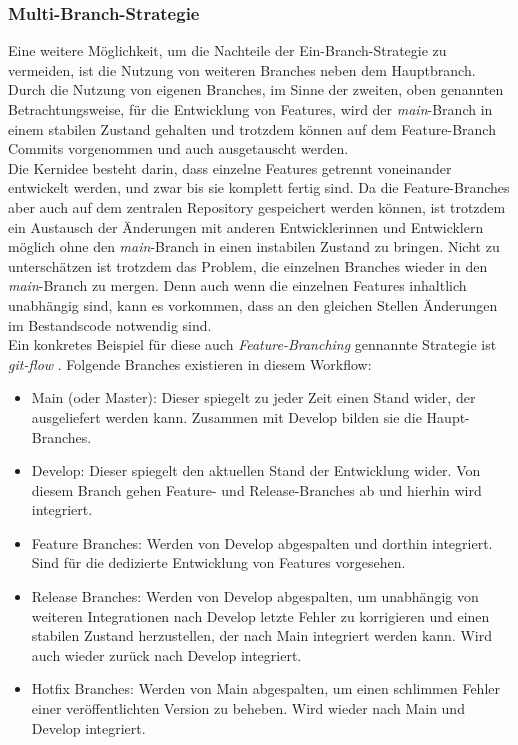 \subsubsection{Multi-Branch-Strategie}
\label{sec:implementierung:workflows:feature}

Eine weitere Möglichkeit, um die Nachteile der Ein-Branch-Strategie zu vermeiden, ist die Nutzung von weiteren Branches neben dem Hauptbranch. 
Durch die Nutzung von eigenen Branches, im Sinne der zweiten, oben genannten Betrachtungsweise, für die Entwicklung von Features, wird der \emph{main}-Branch in einem stabilen Zustand gehalten und trotzdem können auf dem Feature-Branch Commits vorgenommen und auch ausgetauscht werden. 
\\
Die Kernidee besteht darin, dass einzelne Features getrennt voneinander entwickelt werden, und zwar bis sie komplett fertig sind. Da die Feature-Branches aber auch auf dem zentralen Repository gespeichert werden können, ist trotzdem ein Austausch der Änderungen mit anderen Entwicklerinnen und Entwicklern möglich ohne den \emph{main}-Branch in einen instabilen Zustand zu bringen.
Nicht zu unterschätzen ist trotzdem das Problem, die einzelnen Branches wieder in den \emph{main}-Branch zu mergen. Denn auch wenn die einzelnen Features inhaltlich unabhängig sind, kann es vorkommen, dass an den gleichen Stellen Änderungen im Bestandscode notwendig sind.
\\
Ein konkretes Beispiel für diese auch \emph{Feature-Branching} gennannte Strategie ist \emph{git-flow} \cite{Driessen:2010:A-successful:47}. Folgende Branches existieren in diesem Workflow:
\begin{itemize}
\item
Main (oder Master): Dieser spiegelt zu jeder Zeit einen Stand wider, der ausgeliefert werden kann. Zusammen mit Develop bilden sie die Haupt-Branches.
\item
Develop: Dieser spiegelt den aktuellen Stand der Entwicklung wider. Von diesem Branch gehen Feature- und Release-Branches ab und hierhin wird integriert.
\item
Feature Branches: Werden von Develop abgespalten und dorthin integriert. Sind für die dedizierte Entwicklung von Features vorgesehen.
\item
Release Branches: Werden von Develop abgespalten, um unabhängig von weiteren Integrationen nach Develop letzte Fehler zu korrigieren und einen stabilen Zustand herzustellen, der nach Main integriert werden kann. Wird auch wieder zurück nach Develop integriert.
\item
Hotfix Branches: Werden von Main abgespalten, um einen schlimmen Fehler einer veröffentlichten Version zu beheben. Wird wieder nach Main und Develop integriert.
\end{itemize}

